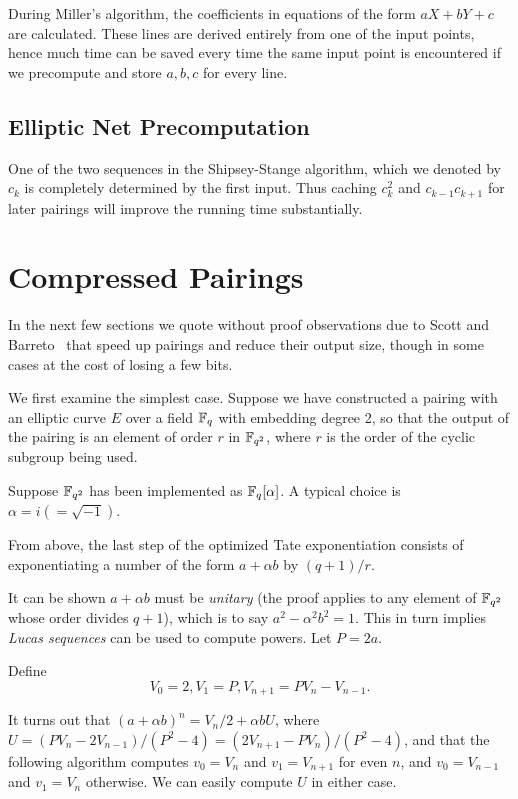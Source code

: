 During Miller's algorithm, the coefficients in equations of the form
$aX + bY + c$ are calculated. These lines
are derived entirely from one of the input points,
hence much time can be saved every time the same input point is encountered
if we precompute and store $a, b, c$ for every line.

\subsection {Elliptic Net Precomputation}

One of the two sequences in the Shipsey-Stange algorithm, which
we denoted by $c_k$ is completely determined by the first input.
Thus caching $c_k^2$ and $c_{k-1}c_{k+1}$ for later pairings
will improve the running time substantially.

\section {\label{sec:compressedpairings}Compressed Pairings}

In the next few sections we quote without proof observations
due to Scott and Barreto~\cite{compressedpairings} that speed up pairings and
reduce their output size, though in some cases at the cost of losing a few bits.

We first examine the simplest case.
Suppose we have constructed a pairing
with an elliptic curve $E$ over a field $\mathbb{F}_q$ with embedding degree 2,
so that the output of the pairing is an element of order $r$
in $\mathbb{F}_{q^2}$, where $r$ is the order of the cyclic subgroup being used.

Suppose $\mathbb{F}_{q^2}$ has been implemented as $\mathbb{F}_q[\alpha]$.
A typical choice is $\alpha = i (=\sqrt{-1})$.

From above, the last step of the optimized Tate exponentiation
consists of exponentiating a number of the form $a + \alpha b$ by
$(q + 1) / r$.

It can be shown $a + \alpha b$ must be \emph {unitary} (the proof
applies to any element of $\mathbb{F}_{q^2}$ whose order divides $q+1$), which
is to say $a^2 - \alpha^2 b^2 = 1$. This in turn implies
\emph{Lucas sequences} can be used to compute powers. Let $P = 2a$.

Define
\[ V_0 = 2, V_1 = P, V_{n+1} = P V_n - V_{n-1} . \]

It turns out that $(a+\alpha b)^n = V_n / 2 + \alpha b U$,
where $U = (P V_n - 2 V_{n-1}) / (P^2 - 4)
= (2 V_{n+1} - P V_n) / (P^2 - 4)$,
and that the following algorithm
computes $v_0 = V_n$ and $v_1 = V_{n+1}$ for even $n$,
and $v_0 = V_{n-1}$ and $v_1 = V_n$ otherwise.
We can easily compute $U$ in either case.

